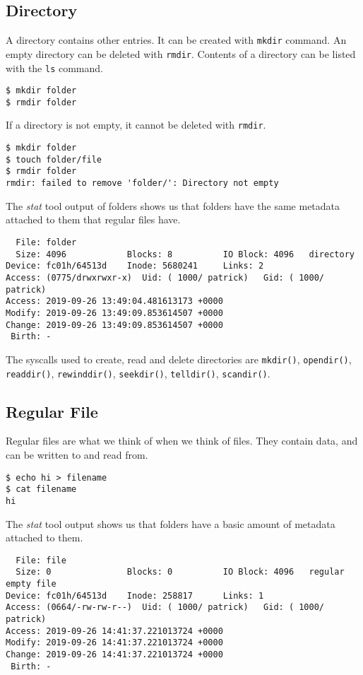 \documentclass[a4paper]{article}
\begin{document}
\subsection{Directory}

A directory contains other entries. It can be created with \verb|mkdir| command. An empty directory can be deleted with \verb|rmdir|. Contents of a directory can be listed with the \verb|ls| command.

\begin{verbatim}
$ mkdir folder
$ rmdir folder  
\end{verbatim}
If a directory is not empty, it cannot be deleted with \verb|rmdir|.

\begin{verbatim}
$ mkdir folder
$ touch folder/file
$ rmdir folder
rmdir: failed to remove 'folder/': Directory not empty
\end{verbatim}
The \emph{stat} tool output of folders shows us that folders have the same metadata attached to them that regular files have.

\begin{verbatim}
  File: folder
  Size: 4096            Blocks: 8          IO Block: 4096   directory
Device: fc01h/64513d    Inode: 5680241     Links: 2
Access: (0775/drwxrwxr-x)  Uid: ( 1000/ patrick)   Gid: ( 1000/ patrick)
Access: 2019-09-26 13:49:04.481613173 +0000
Modify: 2019-09-26 13:49:09.853614507 +0000
Change: 2019-09-26 13:49:09.853614507 +0000
 Birth: -  
\end{verbatim}

The syscalls used to create, read and delete directories are \verb|mkdir()|, \verb|opendir()|, \verb|readdir()|, \verb|rewinddir()|, \verb|seekdir()|, \verb|telldir()|, \verb|scandir()|.

\subsection{Regular File}

Regular files are what we think of when we think of files. They contain data, and can be written to and read from.

\begin{verbatim}
$ echo hi > filename
$ cat filename
hi  
\end{verbatim}
The \emph{stat} tool output shows us that folders have a basic amount of metadata attached to them.

\begin{verbatim}
  File: file
  Size: 0               Blocks: 0          IO Block: 4096   regular empty file
Device: fc01h/64513d    Inode: 258817      Links: 1
Access: (0664/-rw-rw-r--)  Uid: ( 1000/ patrick)   Gid: ( 1000/ patrick)
Access: 2019-09-26 14:41:37.221013724 +0000
Modify: 2019-09-26 14:41:37.221013724 +0000
Change: 2019-09-26 14:41:37.221013724 +0000
 Birth: -
\end{verbatim}
\end{document}
